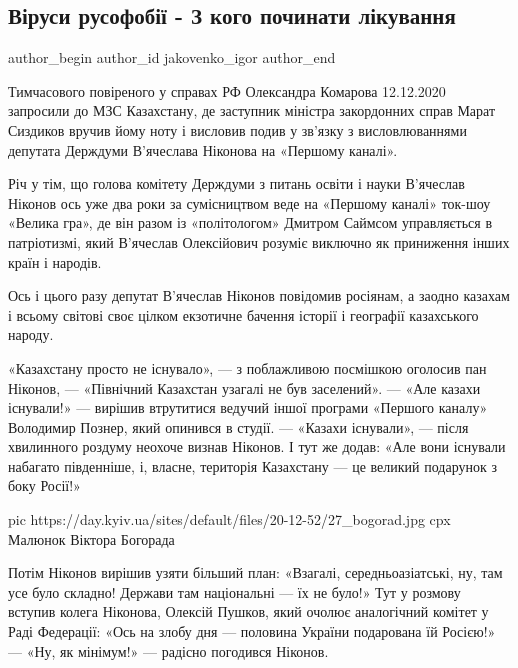  
 
 
 
 
 
\subsection{Віруси русофобії - З кого починати лікування}
\label{sec:17_12_2020.news.ua.day_kiev_ua.jakovenko_igor.1.virusy_rusofobii}
\ifcmt
	author_begin
   author_id jakovenko_igor
	author_end
\fi

Тимчасового повіреного у справах РФ Олександра Комарова 12.12.2020 запросили до
МЗС Казахстану, де заступник міністра закордонних справ Марат Сиздиков вручив
йому ноту і висловив подив у зв’язку з висловлюваннями депутата Держдуми
В’ячеслава Ніконова на «Першому каналі».

Річ у тім, що голова комітету Держдуми з питань освіти і науки В’ячеслав
Ніконов ось уже два роки за сумісництвом веде на «Першому каналі» ток-шоу
«Велика гра», де він разом із «політологом» Дмитром Саймсом управляється в
патріотизмі, який В’ячеслав Олексійович розуміє виключно як приниження інших
країн і народів.

Ось і цього разу депутат В’ячеслав Ніконов повідомив росіянам, а заодно казахам
і всьому світові своє цілком екзотичне бачення історії і географії казахського
народу.

«Казахстану просто не існувало», — з поблажливою посмішкою оголосив пан
Ніконов, — «Північний Казахстан узагалі не був заселений». — «Але казахи
існували!» — вирішив втрутитися ведучий іншої програми «Першого каналу»
Володимир Познер, який опинився в студії. — «Казахи існували», — після
хвилинного роздуму неохоче визнав Ніконов. І тут же додав: «Але вони існували
набагато південніше, і, власне, територія Казахстану — це великий подарунок з
боку Росії!»

\ifcmt
pic https://day.kyiv.ua/sites/default/files/20-12-52/27_bogorad.jpg
cpx Малюнок Віктора Богорада
\fi

Потім Ніконов вирішив узяти більший план: «Взагалі, середньоазіатські, ну, там
усе було складно! Держави там національні — їх не було!» Тут у розмову вступив
колега Ніконова, Олексій Пушков, який очолює аналогічний комітет у Раді
Федерації: «Ось на злобу дня — половина України подарована їй Росією!» — «Ну,
як мінімум!» — радісно погодився Ніконов.

